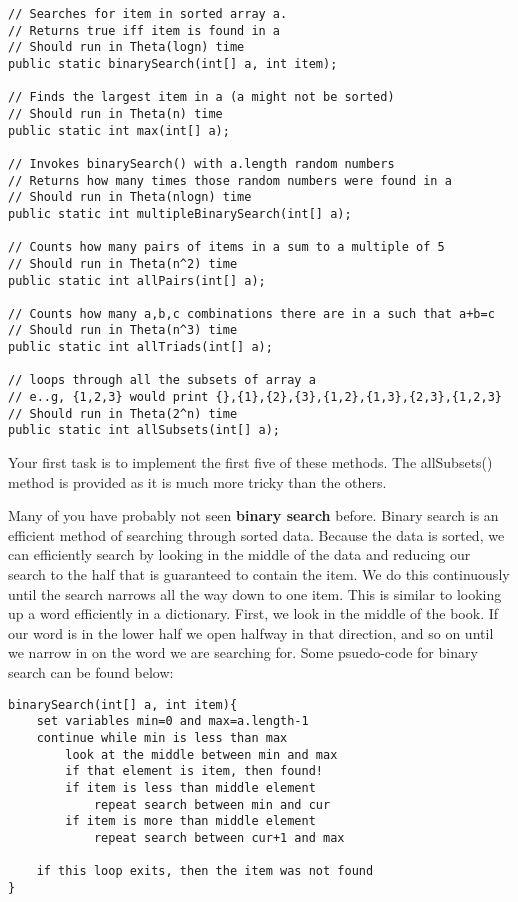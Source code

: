 \documentclass[paper=a4, fontsize=11pt, parskip=full]{scrartcl} %
\numberwithin{equation}{section} %
\numberwithin{figure}{section} %
\numberwithin{table}{section} %
\begin{document}
\begin{lstlisting}
// Searches for item in sorted array a.
// Returns true iff item is found in a
// Should run in Theta(logn) time
public static binarySearch(int[] a, int item);

// Finds the largest item in a (a might not be sorted)
// Should run in Theta(n) time
public static int max(int[] a);

// Invokes binarySearch() with a.length random numbers
// Returns how many times those random numbers were found in a
// Should run in Theta(nlogn) time
public static int multipleBinarySearch(int[] a);

// Counts how many pairs of items in a sum to a multiple of 5
// Should run in Theta(n^2) time
public static int allPairs(int[] a);

// Counts how many a,b,c combinations there are in a such that a+b=c
// Should run in Theta(n^3) time
public static int allTriads(int[] a);

// loops through all the subsets of array a
// e..g, {1,2,3} would print {},{1},{2},{3},{1,2},{1,3},{2,3},{1,2,3}
// Should run in Theta(2^n) time
public static int allSubsets(int[] a);
\end{lstlisting}

Your first task is to implement the first five of these methods. The allSubsets() method is provided as it is much more tricky than the others.

Many of you have probably not seen \textbf{binary search} before. Binary search is an efficient method of searching through sorted data. Because the data is sorted, we can efficiently search by looking in the middle of the data and reducing our search to the half that is guaranteed to contain the item. We do this continuously until the search narrows all the way down to one item. This is similar to looking up a word efficiently in a dictionary. First, we look in the middle of the book. If our word is in the lower half we open halfway in that direction, and so on until we narrow in on the word we are searching for. Some psuedo-code for binary search can be found below:

\begin{lstlisting}
binarySearch(int[] a, int item){
	set variables min=0 and max=a.length-1
	continue while min is less than max
		look at the middle between min and max
		if that element is item, then found!
		if item is less than middle element
			repeat search between min and cur
		if item is more than middle element
			repeat search between cur+1 and max

	if this loop exits, then the item was not found
}
\end{lstlisting}
\end{document}
